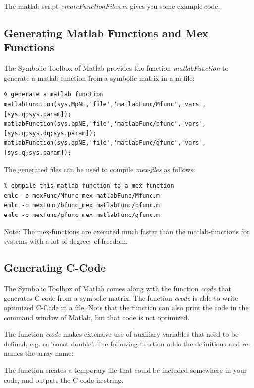 The matlab script \emph{createFunctionFiles.m} gives you some example code.

\subsection{Generating Matlab Functions and Mex Functions}
The Symbolic Toolbox of Matlab provides the function \emph{matlabFunction} to generate a matlab function from a symbolic matrix in a m-file:

\begin{lstlisting}
% generate a matlab function
matlabFunction(sys.MpNE,'file','matlabFunc/Mfunc','vars',[sys.q;sys.param]);
matlabFunction(sys.bpNE,'file','matlabFunc/bfunc','vars',[sys.q;sys.dq;sys.param]);
matlabFunction(sys.gpNE,'file','matlabFunc/gfunc','vars',[sys.q;sys.param]);
\end{lstlisting}

The generated files can be used to compile \emph{mex-files} as follows:

\begin{lstlisting}
% compile this matlab function to a mex function
emlc -o mexFunc/Mfunc_mex matlabFunc/Mfunc.m
emlc -o mexFunc/bfunc_mex matlabFunc/bfunc.m
emlc -o mexFunc/gfunc_mex matlabFunc/gfunc.m
\end{lstlisting}

Note: The mex-functions are executed much faster than the matlab-functions for systems with a lot of degrees of freedom.

\subsection{Generating C-Code}
The Symbolic Toolbox of Matlab comes along with the function \emph{ccode} that generates C-code from a symbolic matrix.
The function \emph{ccode} is able to write optimized C-Code in a file. 
Note that the function can also print the code in the command window of Matlab, but that code is not optimized. 


The function \emph{ccode} makes extensive use of auxiliary variables that need to be defined, e.g. as 'const double'.
The following function adds the definitions and re-names the array name:


The function creates a temporary file that could be included somewhere in your code, and outputs the C-code in string.


